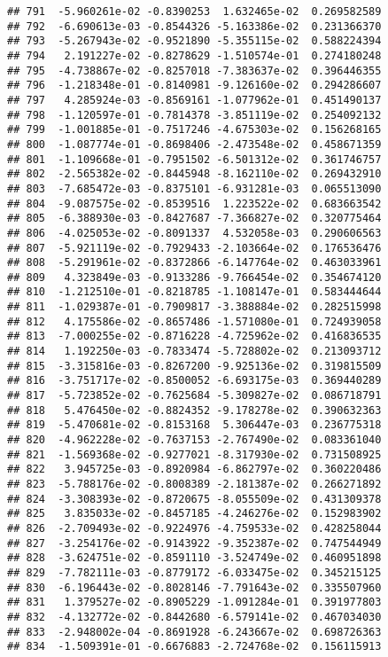 \documentclass[
]{article}
\begin{document}
\begin{verbatim}
## 791  -5.960261e-02 -0.8390253  1.632465e-02  0.269582589
## 792  -6.690613e-03 -0.8544326 -5.163386e-02  0.231366370
## 793  -5.267943e-02 -0.9521890 -5.355115e-02  0.588224394
## 794   2.191227e-02 -0.8278629 -1.510574e-01  0.274180248
## 795  -4.738867e-02 -0.8257018 -7.383637e-02  0.396446355
## 796  -1.218348e-01 -0.8140981 -9.126160e-02  0.294286607
## 797   4.285924e-03 -0.8569161 -1.077962e-01  0.451490137
## 798  -1.120597e-01 -0.7814378 -3.851119e-02  0.254092132
## 799  -1.001885e-01 -0.7517246 -4.675303e-02  0.156268165
## 800  -1.087774e-01 -0.8698406 -2.473548e-02  0.458671359
## 801  -1.109668e-01 -0.7951502 -6.501312e-02  0.361746757
## 802  -2.565382e-02 -0.8445948 -8.162110e-02  0.269432910
## 803  -7.685472e-03 -0.8375101 -6.931281e-03  0.065513090
## 804  -9.087575e-02 -0.8539516  1.223522e-02  0.683663542
## 805  -6.388930e-03 -0.8427687 -7.366827e-02  0.320775464
## 806  -4.025053e-02 -0.8091337  4.532058e-03  0.290606563
## 807  -5.921119e-02 -0.7929433 -2.103664e-02  0.176536476
## 808  -5.291961e-02 -0.8372866 -6.147764e-02  0.463033961
## 809   4.323849e-03 -0.9133286 -9.766454e-02  0.354674120
## 810  -1.212510e-01 -0.8218785 -1.108147e-01  0.583444644
## 811  -1.029387e-01 -0.7909817 -3.388884e-02  0.282515998
## 812   4.175586e-02 -0.8657486 -1.571080e-01  0.724939058
## 813  -7.000255e-02 -0.8716228 -4.725962e-02  0.416836535
## 814   1.192250e-03 -0.7833474 -5.728802e-02  0.213093712
## 815  -3.315816e-03 -0.8267200 -9.925136e-02  0.319815509
## 816  -3.751717e-02 -0.8500052 -6.693175e-03  0.369440289
## 817  -5.723852e-02 -0.7625684 -5.309827e-02  0.086718791
## 818   5.476450e-02 -0.8824352 -9.178278e-02  0.390632363
## 819  -5.470681e-02 -0.8153168  5.306447e-03  0.236775318
## 820  -4.962228e-02 -0.7637153 -2.767490e-02  0.083361040
## 821  -1.569368e-02 -0.9277021 -8.317930e-02  0.731508925
## 822   3.945725e-03 -0.8920984 -6.862797e-02  0.360220486
## 823  -5.788176e-02 -0.8008389 -2.181387e-02  0.266271892
## 824  -3.308393e-02 -0.8720675 -8.055509e-02  0.431309378
## 825   3.835033e-02 -0.8457185 -4.246276e-02  0.152983902
## 826  -2.709493e-02 -0.9224976 -4.759533e-02  0.428258044
## 827  -3.254176e-02 -0.9143922 -9.352387e-02  0.747544949
## 828  -3.624751e-02 -0.8591110 -3.524749e-02  0.460951898
## 829  -7.782111e-03 -0.8779172 -6.033475e-02  0.345215125
## 830  -6.196443e-02 -0.8028146 -7.791643e-02  0.335507960
## 831   1.379527e-02 -0.8905229 -1.091284e-01  0.391977803
## 832  -4.132772e-02 -0.8442680 -6.579141e-02  0.467034030
## 833  -2.948002e-04 -0.8691928 -6.243667e-02  0.698726363
## 834  -1.509391e-01 -0.6676883 -2.724768e-02  0.156115913

\end{verbatim}
\end{document}
